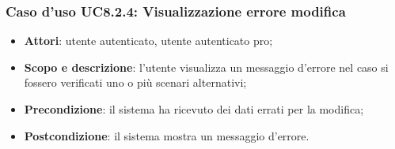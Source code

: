 	\subsubsection{Caso d'uso UC8.2.4: Visualizzazione errore modifica}
	\begin{itemize}
		\item
			\textbf{Attori}: utente autenticato, utente autenticato pro;
		\item
			\textbf{Scopo e descrizione}: l'utente visualizza un messaggio d'errore nel caso si fossero verificati uno o più scenari alternativi;
		\item		
			\textbf{Precondizione}: il sistema ha ricevuto dei dati errati per la modifica;
		\item
			\textbf{Postcondizione}: il sistema mostra un messaggio d'errore.
	\end{itemize}	
	
